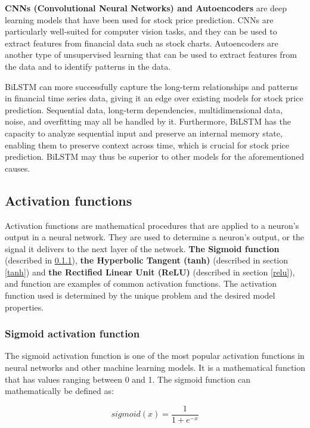 \documentclass[a4paper]{article}
\begin{document}
\textbf{CNNs (Convolutional Neural Networks) and Autoencoders} are deep learning models that have been used for stock price prediction. CNNs are particularly well-suited for computer vision tasks, and they can be used to extract features from financial data such as stock charts. Autoencoders are another type of unsupervised learning that can be used to extract features from the data and to identify patterns in the data.

BiLSTM can more successfully capture the long-term relationships and patterns in financial time series data, giving it an edge over existing models for stock price prediction. Sequential data, long-term dependencies, multidimensional data, noise, and overfitting may all be handled by it. Furthermore, BiLSTM has the capacity to analyze sequential input and preserve an internal memory state, enabling them to preserve context across time, which is crucial for stock price prediction. BiLSTM may thus be superior to other models for the aforementioned causes.
\subsection{Activation functions}

Activation functions are mathematical procedures that are applied to a neuron's output in a neural network. They are used to determine a neuron's output, or the signal it delivers to the next layer of the network. \textbf{The Sigmoid function} (described in \ref{sigmoid}), \textbf{the Hyperbolic Tangent (tanh)} (described in section \ref{tanh}) and\textbf{ the Rectified Linear Unit (ReLU)} (described in section \ref{relu}), and function are examples of common activation functions. The activation function used is determined by the unique problem and the desired model properties.
\subsubsection{Sigmoid activation function} \label{sigmoid}

The sigmoid activation function is one of the most popular activation functions in neural networks and other machine learning models. It is a mathematical function that has values ranging between 0 and 1. The sigmoid function can mathematically be defined as:

$$
sigmoid(x) = \frac{1}{1+e^{-x}}
$$
\end{document}

